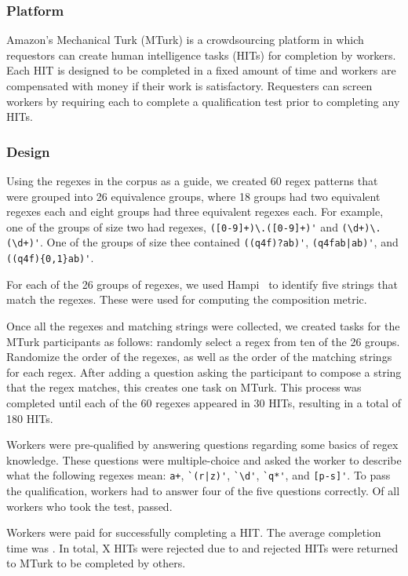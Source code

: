 \subsubsection{Platform}
Amazon's Mechanical Turk (MTurk) is a crowdsourcing platform in which requestors can create human intelligence tasks (HITs) for completion by workers. Each HIT is designed to be completed in a fixed amount of time and workers are compensated with money if their work is satisfactory. Requesters can screen workers by requiring each to complete a qualification test prior to completing any HITs.

\subsubsection{Design}
Using the regexes in the corpus as a guide, we created 60 regex patterns that were grouped into 26 equivalence groups, where 18 groups had two equivalent regexes each and eight groups had three equivalent regexes each. For example, one of the groups of size two had regexes, \verb!([0-9]+)\.([0-9]+)'! and \verb!(\d+)\.(\d+)'!. One of the groups of size thee contained \verb!((q4f)?ab)'!, \verb!(q4fab|ab)'!, and \verb!((q4f){0,1}ab)'!.

For each of the 26 groups of regexes, we used Hampi~\cite{hampi} to identify five strings that match the regexes. These were used for computing the composition metric.

Once all the regexes and matching strings were collected, we created tasks for the MTurk participants as follows: randomly select a regex from ten of the 26 groups. Randomize the order of the regexes, as well as the order of the matching strings for each regex. After adding a question asking the participant to compose a string that the regex matches, this creates one task on MTurk. This process was completed until each of the 60 regexes appeared in 30 HITs, resulting in a total of 180 HITs.

Workers were pre-qualified by answering questions regarding some basics of regex knowledge. These questions were multiple-choice and asked the worker to describe what the following regexes mean: \verb!a+!, \verb!`(r|z)'!, \verb!`\d'!, \verb!`q*'!, and \verb![p-s]'!. To pass the qualification, workers had to answer four of the five questions correctly. Of all workers who took the test,  passed.

Workers were paid  for successfully completing a HIT.
The average completion time was .
In total, X HITs were rejected due to  and rejected HITs were returned to MTurk to be completed by others.


